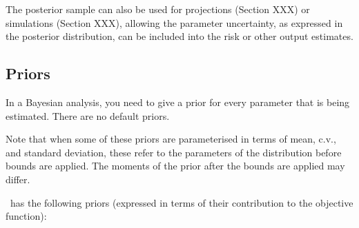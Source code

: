 The posterior sample can also be used for projections (Section XXX) or simulations (Section XXX), allowing the parameter uncertainty, as expressed in the posterior distribution, can be included into the risk or other output estimates.

\subsection{Priors\label{sec:priors}}

In a Bayesian analysis, you need to give a prior for every parameter that is being estimated. There are no default priors.  

Note that when some of these priors are parameterised in terms of mean, c.v., and standard deviation, these refer to the parameters of the distribution before bounds are applied. The moments of the prior after the bounds are applied may differ.

\SPM\ has the following priors (expressed in terms of their contribution to the objective function): 

